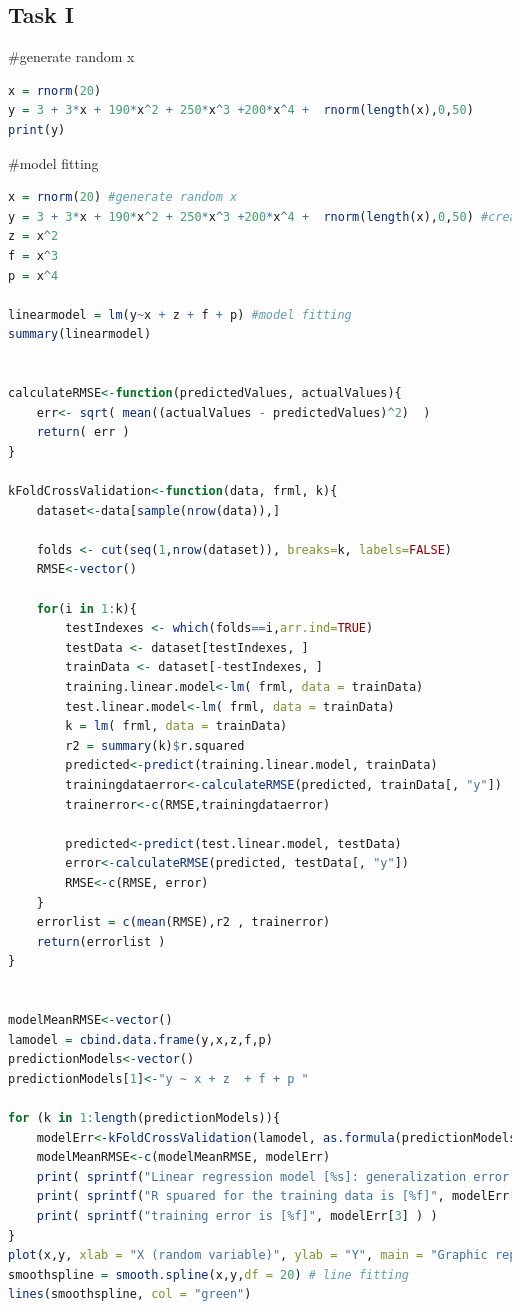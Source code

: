 \documentclass[10pt,a4paper]{article}
\begin{document}
\subsection{Task I}
\#generate random x
\begin{lstlisting}[language=R]
x = rnorm(20)
y = 3 + 3*x + 190*x^2 + 250*x^3 +200*x^4 +  rnorm(length(x),0,50)
print(y)
	\end{lstlisting}
\#model fitting
\begin{lstlisting}[language=R]
x = rnorm(20) #generate random x
y = 3 + 3*x + 190*x^2 + 250*x^3 +200*x^4 +  rnorm(length(x),0,50) #create y for model
z = x^2
f = x^3
p = x^4

linearmodel = lm(y~x + z + f + p) #model fitting
summary(linearmodel)


calculateRMSE<-function(predictedValues, actualValues){
	err<- sqrt( mean((actualValues - predictedValues)^2)  )
	return( err )
}

kFoldCrossValidation<-function(data, frml, k){
	dataset<-data[sample(nrow(data)),]
	
	folds <- cut(seq(1,nrow(dataset)), breaks=k, labels=FALSE)
	RMSE<-vector()
	
	for(i in 1:k){
		testIndexes <- which(folds==i,arr.ind=TRUE)
		testData <- dataset[testIndexes, ]
		trainData <- dataset[-testIndexes, ]
		training.linear.model<-lm( frml, data = trainData)
		test.linear.model<-lm( frml, data = trainData)
		k = lm( frml, data = trainData)
		r2 = summary(k)$r.squared 
		predicted<-predict(training.linear.model, trainData)
		trainingdataerror<-calculateRMSE(predicted, trainData[, "y"])
		trainerror<-c(RMSE,trainingdataerror)
		
		predicted<-predict(test.linear.model, testData)
		error<-calculateRMSE(predicted, testData[, "y"])
		RMSE<-c(RMSE, error)
	}
	errorlist = c(mean(RMSE),r2 , trainerror)
	return(errorlist )
}


modelMeanRMSE<-vector()
lamodel = cbind.data.frame(y,x,z,f,p)
predictionModels<-vector()
predictionModels[1]<-"y ~ x + z  + f + p "

for (k in 1:length(predictionModels)){
	modelErr<-kFoldCrossValidation(lamodel, as.formula(predictionModels[k]), 10)
	modelMeanRMSE<-c(modelMeanRMSE, modelErr)
	print( sprintf("Linear regression model [%s]: generalization error [%f]", predictionModels[k], modelErr[1] ) )
	print( sprintf("R spuared for the training data is [%f]", modelErr[2] ) )
	print( sprintf("training error is [%f]", modelErr[3] ) )
}
plot(x,y, xlab = "X (random variable)", ylab = "Y", main = "Graphic representation of Overfitting in our random data" ) #plot for data 
smoothspline = smooth.spline(x,y,df = 20) # line fitting 
lines(smoothspline, col = "green")




\end{lstlisting}
\end{document}
